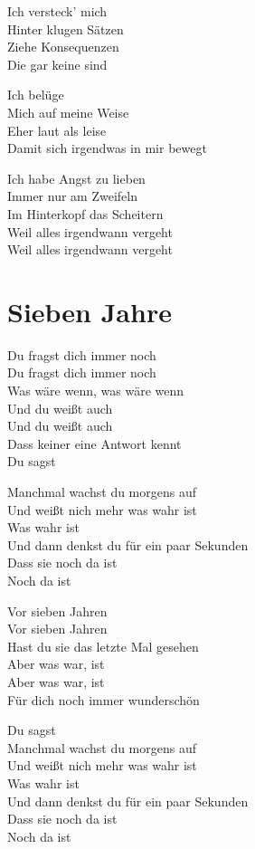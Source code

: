 \documentclass[]{book}
\begin{document}
Ich versteck' mich\\
Hinter klugen Sätzen\\
Ziehe Konsequenzen\\
Die gar keine sind

Ich belüge\\
Mich auf meine Weise\\
Eher laut als leise\\
Damit sich irgendwas in mir bewegt

Ich habe Angst zu lieben\\
Immer nur am Zweifeln\\
Im Hinterkopf das Scheitern\\
Weil alles irgendwann vergeht\\
Weil alles irgendwann vergeht

\hypertarget{sieben-jahre}{%
\section{Sieben Jahre}\label{sieben-jahre}}

Du fragst dich immer noch\\
Du fragst dich immer noch\\
Was wäre wenn, was wäre wenn\\
Und du weißt auch\\
Und du weißt auch\\
Dass keiner eine Antwort kennt\\
Du sagst

Manchmal wachst du morgens auf\\
Und weißt nich mehr was wahr ist\\
Was wahr ist\\
Und dann denkst du für ein paar Sekunden\\
Dass sie noch da ist\\
Noch da ist

Vor sieben Jahren\\
Vor sieben Jahren\\
Hast du sie das letzte Mal gesehen\\
Aber was war, ist\\
Aber was war, ist\\
Für dich noch immer wunderschön

Du sagst\\
Manchmal wachst du morgens auf\\
Und weißt nich mehr was wahr ist\\
Was wahr ist\\
Und dann denkst du für ein paar Sekunden\\
Dass sie noch da ist\\
Noch da ist
\end{document}
